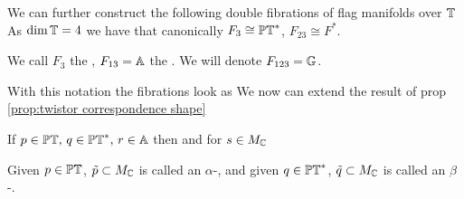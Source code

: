 \documentclass{article}
\begin{document}
We can further construct the following double fibrations of flag manifolds over $\mathbb{T}$ 
As $\dim \mathbb{T}=4$ we have that canonically $F_3 \cong \mathbb{PT}^\ast$, $F_{23} \cong F^\ast$. 
\begin{definition}
 We call $F_3$ the , $F_{13} = \mathbb{A}$ the . We will denote $F_{123} = \mathbb{G}$. 
\end{definition}
With this notation the  fibrations look as 
We now can extend the result of prop \ref{prop:twistor correspondence shape}
\begin{prop}
	If $p \in \mathbb{PT}, \, q \in \mathbb{PT}^\ast,\, r \in \mathbb{A}$ then 
and for $s \in M_{\mathbb{C}}$
\end{prop}
\begin{definition}
	Given $p \in \mathbb{PT}$, $\tilde{p} \subset M_{\mathbb{C}}$ is called an $\alpha$-, and given $q \in \mathbb{PT}^\ast$, $\tilde{q} \subset M_{\mathbb{C}}$ is called an $\beta$-.
\end{definition}
\end{document}

